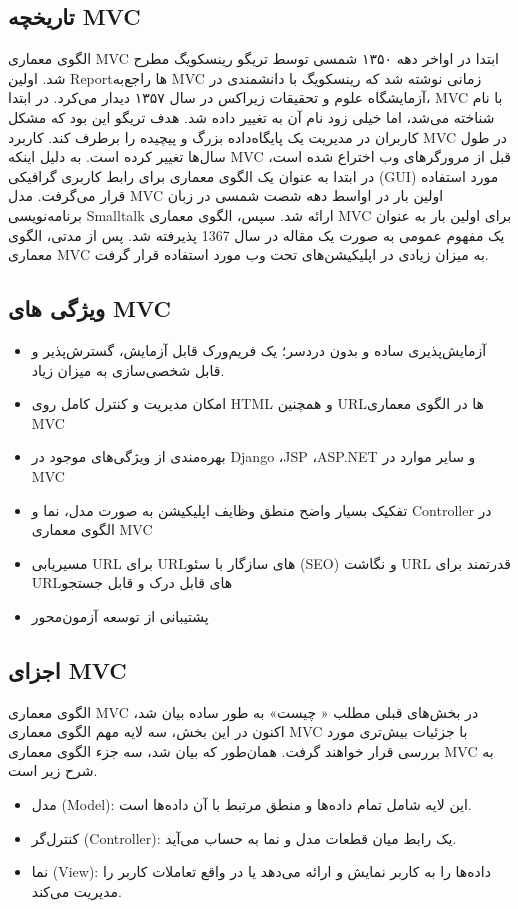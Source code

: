 \subsection{تاریخچه MVC}
الگوی معماری MVC ابتدا در ‌اواخر دهه ۱۳۵۰ شمسی توسط تریگو رینسکویگ
 مطرح شد. اولین Report‌ها راجع‌به MVC زمانی نوشته شد که رینسکویگ با دانشمندی در آزمایشگاه علوم و تحقیقات زیراکس
  در سال ۱۳۵۷ دیدار می‌کرد. در ابتدا، MVC با نام
 شناخته می‌شد، اما خیلی زود نام آن به
 تغییر داده شد. هدف تریگو این بود که مشکل کاربران در مدیریت یک پایگاه‌داده بزرگ و پیچیده را برطرف کند.
کاربرد MVC‌ در طول سال‌ها تغییر کرده است. به دلیل اینکه MVC‌ قبل از مرورگرهای وب اختراع شده است، در ابتدا به عنوان یک الگوی معماری برای رابط کاربری گرافیکی (GUI) مورد استفاده قرار می‌گرفت. مدل MVC اولین بار در اواسط دهه شصت شمسی در زبان برنامه‌نویسی Smalltalk ارائه شد. سپس، الگوی معماری MVC برای اولین بار به عنوان یک مفهوم عمومی به صورت یک مقاله در سال 1367 پذیرفته شد. پس از مدتی، الگوی معماری MVC به میزان زیادی در اپلیکیشن‌های تحت وب مورد استفاده قرار گرفت.

\subsection{ویژگی های MVC}
\begin{itemize}
	\item
	آزمایش‌پذیری ساده و بدون دردسر؛ یک فریم‌ورک قابل آزمایش، گسترش‌پذیر و قابل شخصی‌سازی به میزان زیاد.
	\item
	امکان مدیریت و کنترل کامل روی HTML و همچنین URLها در الگوی معماری MVC
	\item
	بهره‌مندی از ویژگی‌های موجود در Django ،JSP ،ASP.NET و سایر موارد در MVC
	\item
	تفکیک بسیار واضح منطق وظایف اپلیکیشن به صورت مدل، نما و Controller‌ در الگوی معماری MVC
	\item
	مسیریابی URL‌ برای URLهای سازگار با سئو (SEO) و نگاشت URL قدرتمند برای URLهای قابل درک و قابل جستجو
	\item
	پشتیبانی از توسعه آزمون‌محور
\end{itemize}


\subsection{اجزای MVC}
الگوی معماری MVC در بخش‌های قبلی مطلب « چیست» به طور ساده بیان شد، اکنون در این بخش، سه لایه مهم الگوی معماری MVC با جزئیات بیش‌تری مورد بررسی قرار خواهند گرفت. همان‌طور که بیان شد، سه جزء الگوی معماری MVC به شرح زیر است.
\begin{itemize}
	\item
	مدل (Model): این لایه شامل تمام داده‌ها و منطق مرتبط با آن داده‌ها است.
	\item
	کنترل‌گر (Controller): یک رابط میان قطعات مدل و نما به حساب می‌آید.
	\item
	نما (View): داده‌ها را به کاربر نمایش و ارائه می‌دهد یا در واقع تعاملات کاربر را مدیریت می‌کند.
\end{itemize}

